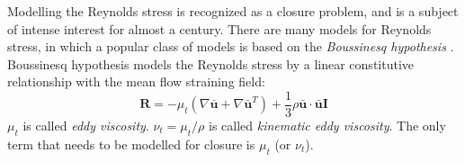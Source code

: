 \documentclass[a4paper,onecolumn]{article}
\theoremstyle{remark}
\begin{document}
\noindent Modelling the Reynolds stress is recognized as a closure problem, and
is a subject of intense interest for almost a century. 
There are many models for Reynolds stress, in which a popular class of 
models is based on the \emph{Boussinesq hypothesis} \cite{Wilcox CFD}.
Boussinesq hypothesis models the Reynolds stress by a linear constitutive relationship with
the mean flow straining field:
\begin{equation}
    \mathbf{R} = -\mu_t \left( \nabla \bar{\mathbf{u}} + \nabla \bar{\mathbf{u}}^T\right)
    + \frac{1}{3}\rho \bar{\mathbf{u}} \cdot \bar{\mathbf{u}} \boldsymbol{I}
\end{equation}
$\mu_t$ is called \emph{eddy viscosity}. 
$\nu_t = \mu_t/\rho$ is called \emph{kinematic eddy viscosity}.
The only term that needs to be modelled for closure is $\mu_t$ (or $\nu_t$).\\
\end{document}
